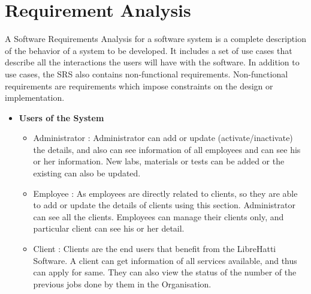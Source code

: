 \section{Requirement Analysis}
A Software Requirements Analysis for a software system is a complete 
description of the behavior of a system to be developed. It includes 
a set of use cases that describe all the interactions the users will 
have with the software. In addition to use cases, the SRS also contains 
non-functional requirements. Non-functional requirements are 
requirements which impose constraints on the design or implementation.
\begin{itemize}

\item{\bf Users of the System}
\begin{itemize} 
\item Administrator : Administrator can add or update 
(activate/inactivate) the details, and also can see information of all 
employees and can see his or her information. New labs, materials or 
tests can be added or the existing can also be updated.
\item Employee : As employees are directly related to clients, so they 
are able to add or update the details of clients using this section. 
Administrator can see all the clients. Employees can manage their 
clients only, and particular client can see his or her detail.
\item Client : Clients are the end users that benefit from the 
LibreHatti Software. A client can get information of all services 
available, and thus can apply for same. They can also view the status 
of the number of the previous jobs done by them in the Organisation.
\end{itemize}
\end{itemize}
